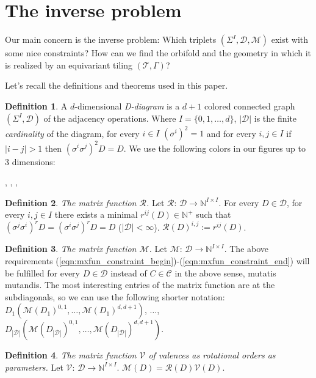 \documentclass[12pt,a4paper]{article}
\numberwithin{equation}{section}
\theoremstyle{plain}%
\theoremstyle{definition}
\newtheorem{defn}{Definition}[section]
\theoremstyle{remark}
\begin{document}
\section{The inverse problem}
Our main concern is the inverse problem: Which triplets
$(\Sigma^I,\mathcal{D},\mathcal{M})$ exist with some nice constraints? How
can we find the orbifold and the geometry in which it is realized by an equivariant tiling
$(\mathcal{T},\Gamma)$?

Let's recall the definitions and theorems used in this paper.
\begin{defn}
  A $d$-dimensional {\em D-diagram} is a $d+1$ colored connected graph $(\Sigma^I,\mathcal{D})$ of the
  adjacency operations. Where $I=\{0, 1, \ldots, d\}$,
  $|\mathcal{D}|$ is the finite {\em cardinality} of the diagram, for every $i\in
  I$ $(\sigma^i)^2=1$ and for every $i,j\in I$ if $|i-j|>1$ then
  $(\sigma^i\sigma^j)^2D=D$. We use the following colors in our figures up to 3
  dimensions:

  \usebox{\LegendVertex}, \usebox{\LegendEdge}, \usebox{\LegendFace},
  \usebox{\LegendBody}
\end{defn}

\begin{defn}
  {\em The matrix function $\mathcal{R}$.}
  Let $\mathcal{R}$: $\mathcal{D} \rightarrow \mathbb{N}^{I\times I}$.
  For every $D\in\mathcal{D}$, for every $i,j\in I$ there exists a minimal
  $r^{ij}(D)\in \mathbb{N}^+$ such that
  $(\sigma^j\sigma^i)^rD=(\sigma^i\sigma^j)^rD=D$ ($|\mathcal{D}|<\infty$).
  $\mathcal{R}(D)^{i,j}:=r^{ij}(D)$.
\end{defn}
  
\begin{defn}
  {\em The matrix function $\mathcal{M}$.}
  Let $\mathcal{M}$: $\mathcal{D} \rightarrow \mathbb{N}^{I\times I}$.
  The above requirements
  (\ref{eqn:mxfun_constraint_begin})-(\ref{eqn:mxfun_constraint_end}) will be
  fulfilled for every $D\in\mathcal{D}$ instead of $C\in\mathcal{C}$ in the
  above sense, mutatis mutandis.
  The most interesting entries of the matrix function are at the subdiagonals, so
  we can use the following shorter notation:
  $D_1(\mathcal{M}(D_1)^{0,1},\ldots,\mathcal{M}(D_1)^{d,d+1})$, $\ldots$,
  $D_{|\mathcal{D}|}(\mathcal{M}(D_{|\mathcal{D}|})^{0,1},\ldots,\mathcal{M}(D_{|\mathcal{D}|})^{d,d+1})$.
\end{defn}

\begin{defn}
  {\em The matrix function $\mathcal{V}$ of valences as rotational orders
  as parameters.}
  Let $\mathcal{V}$: $\mathcal{D} \rightarrow \mathbb{N}^{I\times I}$.
  $\mathcal{M}(D)=\mathcal{R}(D)\mathcal{V}(D)$.
\end{defn}
\end{document}
